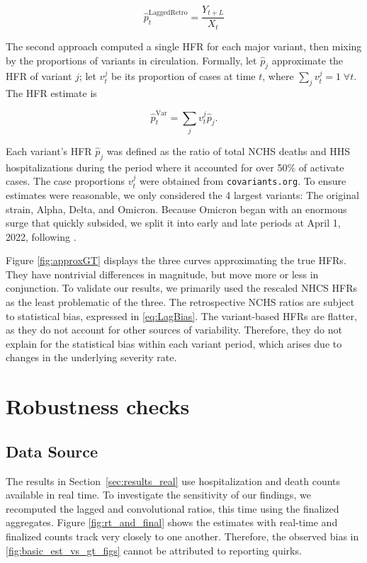 \documentclass{article}
\begin{document}
\begin{equation}\label{eq:LaggedRetro}
    \hat{p}_t^{\text{LaggedRetro}} = \frac{Y_{t+L}}{X_t}
\end{equation}

The second approach computed a single HFR for each major variant, then mixing by the proportions of variants in circulation. Formally, let $\hat{p}_j$ approximate the HFR of variant $j$; let $v_t^j$ be its proportion of cases at time $t$, where $\sum_j v_t^j = 1 \; \forall t$. The HFR estimate is

$$\hat{p}_t^{\text{Var}} = \sum_j v_t^j \hat{p}_j.$$

Each variant's HFR $\hat p_j$ was defined as the ratio of total NCHS deaths and HHS hospitalizations during the period where it accounted for over 50\% of activate cases. The case proportions $v_t^j$ were obtained from \texttt{covariants.org}. To ensure estimates were reasonable, we only considered the 4 largest variants: The original strain, Alpha, Delta, and Omicron. Because Omicron began with an enormous surge that quickly subsided, we split it into early and late periods at April 1, 2022, following \citep{adjei2022mortality}.

Figure \ref{fig:approxGT} displays the three curves approximating the true HFRs. They have nontrivial differences in magnitude, but move more or less in conjunction. To validate our results, we primarily used the rescaled NHCS HFRs as the least problematic of the three. The retrospective NCHS ratios are subject to statistical bias, expressed in \eqref{eq:LagBias}. The variant-based HFRs are flatter, as they do not account for other sources of variability. Therefore, they do not explain for the statistical bias within each variant period, which arises due to changes in the underlying severity rate.  %

\section{Robustness checks}\label{apx:robustness}
\subsection{Data Source}
The results in Section~\ref{sec:results_real} use hospitalization and death counts available in real time. To investigate the sensitivity of our findings, we recomputed the lagged and convolutional ratios, this time using the finalized aggregates. Figure \ref{fig:rt_and_final} shows the estimates with real-time and finalized counts track very closely to one another. Therefore, the observed bias in \ref{fig:basic_est_vs_gt_figs} cannot be attributed to reporting quirks.
\end{document}
